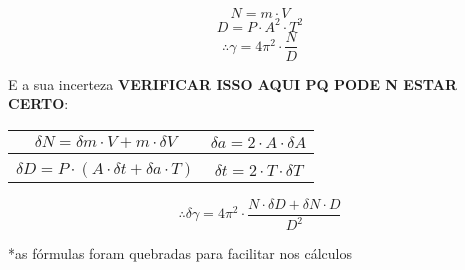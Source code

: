 \[ N = m \cdot V \]
\[ D = P \cdot A^2 \cdot T^2 \]
\[ \therefore \gamma = 4\pi^2 \cdot \frac{N}{D} \]

E a sua incerteza \textbf{VERIFICAR ISSO AQUI PQ PODE N ESTAR CERTO}:

\begin{table}[H]
    \centering
    \begin{tabular}{ c|c  }
         $\delta N = \delta m \cdot V + m \cdot \delta V$ &
         $\delta a = 2 \cdot A \cdot \delta A$\\
         \hline \\
         $\delta D = P \cdot (A \cdot \delta t + \delta a \cdot T)$ &
         $\delta t = 2 \cdot T \cdot \delta T$\\
    \end{tabular}
\end{table}

\[ \therefore \delta \gamma = 4\pi^2 \cdot \frac{N \cdot \delta D + \delta N \cdot D}{D^2}\]

*as fórmulas foram quebradas para facilitar nos cálculos
